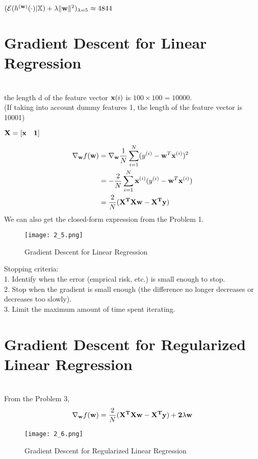 \documentclass[article,11pt]{article}
\begin{document}
\\
	$(\mathcal{E}(h^{(\mathbf{w})}(\cdot) | \mathbb{X})+ \lambda \| {\bf w} \|^{2})_{\lambda=5} \approx 4844$\\

\newpage


\section{Gradient Descent for Linear Regression}
\\
the length d of the feature vector ${\bf x}(i)$ is $100 \times 100 = 10000$.\\
(If taking into account dummy features 1, the length of the feature vector is 10001)

\begin{center}
	$\bf{X}=\left[ {\bf x} \quad 1\right] $\\
\end{center}
\begin{equation}
\begin{aligned}
\nabla_{{\bf w}} f({\bf w}) &=\nabla_{{\bf w}} \frac{1}{N}\sum^{N}_{i=1}(y^{(i)} - {\bf w}^{T} {\bf x}^{(i)})^2 \\
&= -\frac{2}{N}\sum^{N}_{i=1}{\bf x}^{(i)}(y^{(i)} - {\bf w}^{T} {\bf x}^{(i)}) \\
& = \frac{2}{N}(\bf{X}^{T}\bf{X}{\bf w}-\bf{X}^{T}{\bf y})
\end{aligned}
\end{equation}
We can also get the closed-form expression from the Problem 1.
\begin{figure}[H]
	\centering
	\captionsetup{justification=centering}
	\texttt{[image: 2\_5.png]}
	\caption{Gradient Descent for Linear Regression}
\end{figure}
Stopping criteria: \\ 
1. Identify when the error (emprical risk, etc.)  is small enough to stop.\\
2. Stop when the gradient is small enough (the difference no longer decreases or decreases too slowly). \\
3. Limit the maximum amount of time spent iterating.\\
\newpage
\section{Gradient Descent for Regularized Linear Regression}
\\
From the Problem 3,
\begin{equation}
\nabla_{{\bf w}} f({\bf w})= \frac{2}{N}(\bf{X}^{T}\bf{X}{\bf w}-\bf{X}^{T}{\bf y})+2\lambda{\bf w}
\end{equation}
\begin{figure}[H]
	\centering
	\captionsetup{justification=centering}
	\texttt{[image: 2\_6.png]}
	\caption{Gradient Descent for Regularized Linear Regression}
\end{figure}
\newpage
\end{document}
